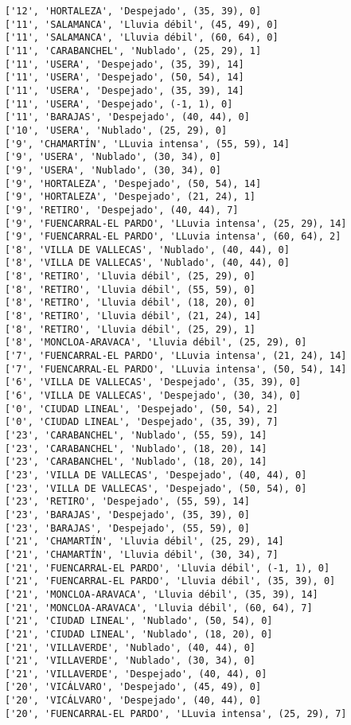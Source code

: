 \documentclass[11pt]{article}
\begin{document}
\begin{Verbatim}[commandchars=\\\{\}]
['12', 'HORTALEZA', 'Despejado', (35, 39), 0]
['11', 'SALAMANCA', 'Lluvia débil', (45, 49), 0]
['11', 'SALAMANCA', 'Lluvia débil', (60, 64), 0]
['11', 'CARABANCHEL', 'Nublado', (25, 29), 1]
['11', 'USERA', 'Despejado', (35, 39), 14]
['11', 'USERA', 'Despejado', (50, 54), 14]
['11', 'USERA', 'Despejado', (35, 39), 14]
['11', 'USERA', 'Despejado', (-1, 1), 0]
['11', 'BARAJAS', 'Despejado', (40, 44), 0]
['10', 'USERA', 'Nublado', (25, 29), 0]
['9', 'CHAMARTÍN', 'LLuvia intensa', (55, 59), 14]
['9', 'USERA', 'Nublado', (30, 34), 0]
['9', 'USERA', 'Nublado', (30, 34), 0]
['9', 'HORTALEZA', 'Despejado', (50, 54), 14]
['9', 'HORTALEZA', 'Despejado', (21, 24), 1]
['9', 'RETIRO', 'Despejado', (40, 44), 7]
['9', 'FUENCARRAL-EL PARDO', 'LLuvia intensa', (25, 29), 14]
['9', 'FUENCARRAL-EL PARDO', 'LLuvia intensa', (60, 64), 2]
['8', 'VILLA DE VALLECAS', 'Nublado', (40, 44), 0]
['8', 'VILLA DE VALLECAS', 'Nublado', (40, 44), 0]
['8', 'RETIRO', 'Lluvia débil', (25, 29), 0]
['8', 'RETIRO', 'Lluvia débil', (55, 59), 0]
['8', 'RETIRO', 'Lluvia débil', (18, 20), 0]
['8', 'RETIRO', 'Lluvia débil', (21, 24), 14]
['8', 'RETIRO', 'Lluvia débil', (25, 29), 1]
['8', 'MONCLOA-ARAVACA', 'Lluvia débil', (25, 29), 0]
['7', 'FUENCARRAL-EL PARDO', 'LLuvia intensa', (21, 24), 14]
['7', 'FUENCARRAL-EL PARDO', 'LLuvia intensa', (50, 54), 14]
['6', 'VILLA DE VALLECAS', 'Despejado', (35, 39), 0]
['6', 'VILLA DE VALLECAS', 'Despejado', (30, 34), 0]
['0', 'CIUDAD LINEAL', 'Despejado', (50, 54), 2]
['0', 'CIUDAD LINEAL', 'Despejado', (35, 39), 7]
['23', 'CARABANCHEL', 'Nublado', (55, 59), 14]
['23', 'CARABANCHEL', 'Nublado', (18, 20), 14]
['23', 'CARABANCHEL', 'Nublado', (18, 20), 14]
['23', 'VILLA DE VALLECAS', 'Despejado', (40, 44), 0]
['23', 'VILLA DE VALLECAS', 'Despejado', (50, 54), 0]
['23', 'RETIRO', 'Despejado', (55, 59), 14]
['23', 'BARAJAS', 'Despejado', (35, 39), 0]
['23', 'BARAJAS', 'Despejado', (55, 59), 0]
['21', 'CHAMARTÍN', 'Lluvia débil', (25, 29), 14]
['21', 'CHAMARTÍN', 'Lluvia débil', (30, 34), 7]
['21', 'FUENCARRAL-EL PARDO', 'Lluvia débil', (-1, 1), 0]
['21', 'FUENCARRAL-EL PARDO', 'Lluvia débil', (35, 39), 0]
['21', 'MONCLOA-ARAVACA', 'Lluvia débil', (35, 39), 14]
['21', 'MONCLOA-ARAVACA', 'Lluvia débil', (60, 64), 7]
['21', 'CIUDAD LINEAL', 'Nublado', (50, 54), 0]
['21', 'CIUDAD LINEAL', 'Nublado', (18, 20), 0]
['21', 'VILLAVERDE', 'Nublado', (40, 44), 0]
['21', 'VILLAVERDE', 'Nublado', (30, 34), 0]
['21', 'VILLAVERDE', 'Despejado', (40, 44), 0]
['20', 'VICÁLVARO', 'Despejado', (45, 49), 0]
['20', 'VICÁLVARO', 'Despejado', (40, 44), 0]
['20', 'FUENCARRAL-EL PARDO', 'LLuvia intensa', (25, 29), 7]

\end{Verbatim}
\end{document}
